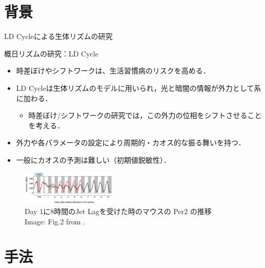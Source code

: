 \section{背景}
\begin{frame}{LD Cycleによる生体リズムの研究}
        \begin{block}{概日リズムの研究：LD Cycle}
          \begin{itemize}
            \item 時差ぼけやシフトワークは、生活習慣病のリスクを高める．
            \item LD Cycleは生体リズムのモデルに用いられ，光と暗闇の情報が外力として系に加わる．\begin{itemize}
              \item 時差ぼけ/シフトワークの研究では，この外力の位相をシフトさせることを考える．
            \end{itemize}
            \item 外力や各パラメータの設定により周期的・カオス的な振る舞いを持つ．
            \item 一般にカオスの予測は難しい（初期値鋭敏性）．
          \end{itemize}
        \end{block}
        \vspace{-.5em}
        \begin{figure}
          \includegraphics[width=0.4\textwidth]{Fig/Jetlag.png}
          \caption{\scriptsize{Day 1に8時間のJet Lagを受けた時のマウスの Per2 の推移}\\\tiny{Image: Fig.2 from \cite{Yamaguchi et al.}.}}
      \end{figure}    
      
  \end{frame}

  \section{手法}

